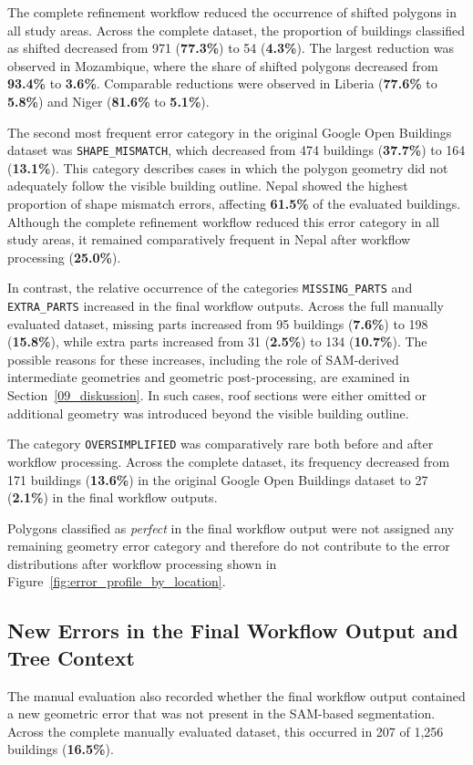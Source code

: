 The complete refinement workflow reduced the occurrence of shifted polygons in all study areas. Across the complete dataset, the proportion of buildings classified as shifted decreased from 971 (\textbf{77.3\%}) to 54 (\textbf{4.3\%}). The largest reduction was observed in Mozambique, where the share of shifted polygons decreased from \textbf{93.4\%} to \textbf{3.6\%}. Comparable reductions were observed in Liberia (\textbf{77.6\%} to \textbf{5.8\%}) and Niger (\textbf{81.6\%} to \textbf{5.1\%}).

The second most frequent error category in the original Google Open Buildings dataset was \texttt{SHAPE\_MISMATCH}, which decreased from 474 buildings (\textbf{37.7\%}) to 164 (\textbf{13.1\%}). This category describes cases in which the polygon geometry did not adequately follow the visible building outline. Nepal showed the highest proportion of shape mismatch errors, affecting \textbf{61.5\%} of the evaluated buildings. Although the complete refinement workflow reduced this error category in all study areas, it remained comparatively frequent in Nepal after workflow processing (\textbf{25.0\%}).

In contrast, the relative occurrence of the categories \texttt{MISSING\_PARTS} and \texttt{EXTRA\_PARTS} increased in the final workflow outputs. Across the full manually evaluated dataset, missing parts increased from 95 buildings (\textbf{7.6\%}) to 198 (\textbf{15.8\%}), while extra parts increased from 31 (\textbf{2.5\%}) to 134 (\textbf{10.7\%}). The possible reasons for these increases, including the role of SAM-derived intermediate geometries and geometric post-processing, are examined in Section~\ref{09_diskussion}. In such cases, roof sections were either omitted or additional geometry was introduced beyond the visible building outline.

The category \texttt{OVERSIMPLIFIED} was comparatively rare both before and after workflow processing. Across the complete dataset, its frequency decreased from 171 buildings (\textbf{13.6\%}) in the original Google Open Buildings dataset to 27 (\textbf{2.1\%}) in the final workflow outputs.

Polygons classified as \textit{perfect} in the final workflow output were not assigned any remaining geometry error category and therefore do not contribute to the error distributions after workflow processing shown in Figure~\ref{fig:error_profile_by_location}.

\subsection{New Errors in the Final Workflow Output and Tree Context}
The manual evaluation also recorded whether the final workflow output contained a new geometric error that was not present in the SAM-based segmentation. Across the complete manually evaluated dataset, this occurred in 207 of 1,256 buildings (\textbf{16.5\%}).


